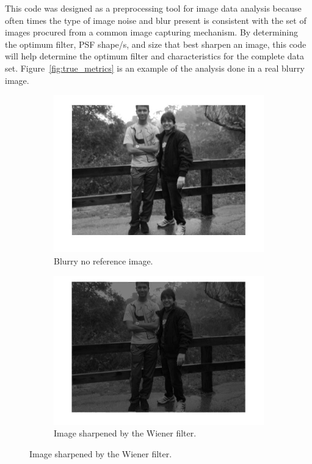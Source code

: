 \noindent This code was designed as a preprocessing tool for image data analysis because often times the type of image noise and blur present is consistent with the set of images procured from a common image capturing mechanism. By determining the optimum filter, PSF shape/s, and size that best sharpen an image, this code will help determine the optimum filter and characteristics for the complete data set. Figure~\ref{fig:true_metrics} is an example of the analysis done in a real blurry image.

\begin{figure}[H]
        \centering
        \begin{subfigure}[b]{0.49\textwidth}
                \centering
                \includegraphics[width=\textwidth]{blur_personal.jpg}
                \caption{Blurry no reference image.}
        \end{subfigure}
        \begin{subfigure}[b]{0.49\textwidth}
                 \centering
                 \includegraphics[width=\textwidth]{sharp_personal_bright.jpg}
                 \caption{Image sharpened by the Wiener filter.}
                 \label{fig:friends}
                       

\end{subfigure}
\end{figure}
